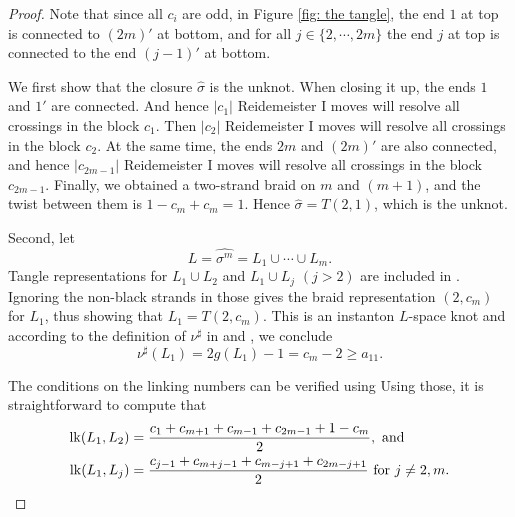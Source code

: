 \documentclass[11pt]{amsart}
\begin{document}
\begin{proof}
Note that since all $c_i$ are odd, in Figure \ref{fig: the tangle}, the end $1$ at top is connected to $(2m)'$ at bottom, and for all $j\in\{2,\cdots,2m\}$ the end $j$ at top is connected to the end $(j-1)'$ at bottom.

We first show that the closure $\hat{\sigma}$ is the unknot. When closing it up, the ends $1$ and $1'$ are connected. And hence $|c_1|$ Reidemeister I moves will resolve all crossings in the block $c_1$. Then $|c_2|$ Reidemeister I moves will resolve all crossings in the block $c_2$. At the same time, the ends $2m$ and $(2m)'$ are also connected, and hence $|c_{2m-1}|$ Reidemeister I moves will resolve all crossings in the block $c_{2m-1}$. Finally, we obtained a two-strand braid on $m$ and $(m+1)$, and the twist between them is $1-c_m + c_m = 1$. Hence $\hat{\sigma}=T(2,1)$, which is the unknot.

Second, let
\[
L = \widehat{\sigma^m} = L_1\cup\cdots\cup L_m.
\]
Tangle representations for $L_1\cup L_2$ and $L_1\cup L_j$ $(j>2)$ are included in . %
Ignoring the non-black strands in those gives the braid representation $(2,c_m)$ for $L_1$, thus showing that $L_1=T(2,c_m)$.  This is an instanton $L$-space knot and according to the definition of $\nu^{\sharp}$ in \cite{baldwin2020concordance} and \cite[Theorem 1.1]{lidman2022framed}, we conclude
\[
\nu^{\sharp}(L_1) = 2g(L_1) - 1 = c_m - 2\geq a_{11}.
\]
%
%		
%		

The conditions on the linking numbers can be verified using %
Using those, it is straightforward to compute that
\begin{align*}
{\rm lk}(L_1,L_2) &= \frac{c_{1}+c_{m+1}+c_{m-1}+c_{2m-1} + 1-c_m}{2}, \text{ and }\\
{\rm lk}(L_1,L_j) &= \frac{c_{j-1}+c_{m+j-1}+c_{m-j+1}+c_{2m-j+1}}{2} \text{ for } j\neq 2,m.
\end{align*}

\end{proof}
\end{document}

